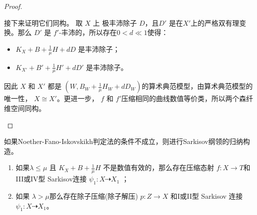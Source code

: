 \begin{proof}
\begin{enumerate}
接下来证明它们同构。 取 $X$ 上  极丰沛除子 $ D $，且$D'  $ 是在$ X' $上的严格双有理变换。那么  $ D' $ 是 $ f' $-丰沛的，所以存在$ 0<d\ll1 $使得：
          \begin{itemize}
            \item $ K_X+B+\frac{1}{\mu }H+dD $ 是丰沛除子；
            \item $ K_{X'}+B'+\frac{1}{\mu }H'+dD' $ 是丰沛除子。
          \end{itemize}
          因此 $X$ 和 $X'$ 都是 $(W,B_{W}+\frac{1}{\mu}H_{W}+dD_{W})$的算术典范模型，由算术典范模型的唯一性， $X\cong X'$。更进一步， $f$ 和  $f'$压缩相同的曲线数值等价类，所以两个森纤维空间同构。
  \end{enumerate}
\end{proof}

如果Noether-Fano-Iskovskikh判定法的条件不成立，则进行Sarkisov纲领的归纳构造。
\begin{lemma}
  \begin{enumerate}
    \item 如果$ \lambda\leqslant\mu $ 且 $ K_X+B+\frac{1}{\mu}H $ 不是数值有效的，那么存在压缩态射 $f:X \to T$和 III或IV型 Sarkisov连接 $\psi_{1}:X\dashrightarrow X_{1}$ ；
    \item  如果 $ \lambda>\mu $那么存在除子压缩(除子解压) $p:Z\to X$ 和I或II型 Sarkisov 连接 $ \psi_{1}:X\dashrightarrow X_{1}$。
  \end{enumerate}
\end{lemma}
